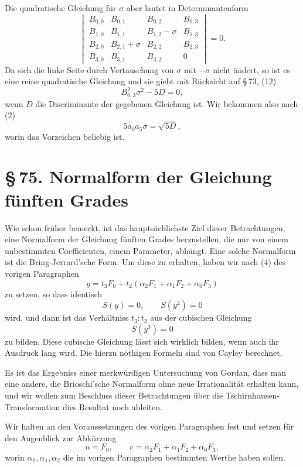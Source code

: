 \documentclass[11pt]{article}
\newcommand{\sect}[2]{\section*{\S\,#1. #2}}
\begin{document}
Die quadratische Gleichung für $\sigma$ aber lautet in Determinantenform
\[
\begin{vmatrix}
 B_{0,0}&B_{0,1}&B_{0,2}&B_{0,3}\\
 B_{1,0}&B_{1,1}&B_{1,2}-\sigma&B_{1,3}\\
 B_{2,0}&B_{2,1}+\sigma&B_{2,2}&B_{2,3}\\
 B_{3,0}&B_{3,1}&B_{3,2}&0
\end{vmatrix}=0.
\]
Da sich die linke Seite durch Vertauschung von $\sigma$ mit $-\sigma$ nicht ändert, so ist es eine reine quadratische Gleichung und sie giebt mit Rücksicht auf \S\,73, (12)
\[
 B_{0,3}^2\sigma^2-5D=0,
\]
wenn $D$ die Discriminante der gegebenen Gleichung ist. Wir bekommen also nach (2)
\begin{equation}
 5a_0a_5\sigma=\sqrt{5D},
\tag{12}
\end{equation}
worin das Vorzeichen beliebig ist.

\sect{75}{Normalform der Gleichung fünften Grades}

Wie schon früher bemerkt, ist das hauptsächlichste Ziel dieser Betrachtungen, eine Normalform der Gleichung fünften Grades herzustellen, die nur von einem unbestimmten Coefficienten, einem Parameter, abhängt. Eine solche Normalform ist die Bring-Jerrard'sche Form. Um diese zu erhalten, haben wir nach (4) des vorigen Paragraphen
\begin{equation}
 y=t_3F_0+t_2(\alpha_2F_1+\alpha_1F_2+\alpha_0F_3)
\tag{1}
\end{equation}
zu setzen, so dass identisch
\[
 S(y)=0,\qquad S(y^2)=0
\]
wird, und dann ist das Verhältniss $t_3:t_2$ aus der cubischen Gleichung
\[
 S(y^3)=0
\]
zu bilden. Diese cubische Gleichung lässt sich wirklich bilden, wenn auch ihr Ausdruck lang wird. Die hierzu nöthigen Formeln sind von Cayley berechnet.

Es ist das Ergebniss einer merkwürdigen Untersuchung von Gordan, dass man eine andere, die Brioschi'sche Normalform ohne neue Irrationalität erhalten kann, und wir wollen zum Beschluss dieser Betrachtungen über die Tschirnhausen-Transformation dies Resultat noch ableiten.

Wir halten an den Voraussetzungen des vorigen Paragraphen fest und setzen für den Augenblick zur Abkürzung
\begin{equation}
 u=F_0,\qquad v=\alpha_2F_1+\alpha_1F_2+\alpha_0F_3,
\tag{2}
\end{equation}
worin $\alpha_0,\alpha_1,\alpha_2$ die im vorigen Paragraphen bestimmten Werthe haben sollen.
\end{document}
